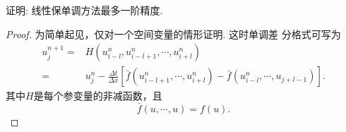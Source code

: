 \documentclass[12pt]{article}
\begin{document}
证明: 线性保单调方法最多一阶精度.


\begin{proof}

	为简单起见，仅对一个空间变量的情形证明. 这时单调差 分格式可写为
	\begin{equation}
		\begin{aligned}
			u_{j}^{n+1}=&H\left(u_{i-l}^{n}, u_{i-l+1}^{n}, \cdots, u_{i+l}^{n}\right)\\
			=&u_{j}^{n}-\frac{\Delta t}{\Delta x}\left[\bar{f}\left(u_{i-l+1}^{n}, \cdots, u_{i+l}^{n}\right)-\bar{f}\left(u_{i-l}^{n}, \cdots, u_{j+l-1}\right)\right].
		\end{aligned}
		\label{eq:21}
	\end{equation}
其中$H$是每个参变量的非减函数，且 
\begin{equation}
	\bar{f}(u, \cdots, u)=f(u).
	\label{eq:22}
\end{equation}


\end{proof}
\end{document}
